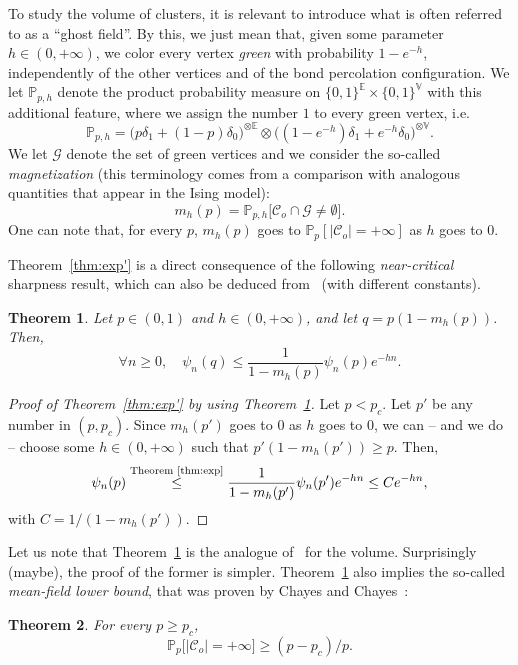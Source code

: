 \documentclass[10pt]{amsart}
\newtheorem{theo}{Theorem}[section]
\theoremstyle{definition}\newtheorem{defi}[theo]{Definition}\newtheorem{rema}[theo]{Remark}\newtheorem{exam}[theo]{Example}\newtheorem{exem}[theo]{Example}\newtheorem{nota}[theo]{Notation}
\newcommand{\E}{\mathbb{E}}
\newcommand{\V}{\mathbb{V}}
\newcommand{\Pro}{\mathbb{P}}
\newcommand{\calC}{\mathcal{C}}
\newcommand{\calG}{\mathcal{G}}
\let\oldforall\forall
\renewcommand*{\forall}{\mathrel{\oldforall}}
\begin{document}
To study the volume of clusters, it is relevant to introduce what is often referred to as a ``ghost field''. By this, we just mean that, given some parameter $h \in (0,+\infty)$, we color every vertex \emph{green} with probability $1-e^{-h}$, independently of the other vertices and of the bond percolation configuration. We let $\Pro_{p,h}$ denote the product probability measure on $\{0,1\}^{\E} \times \{0,1\}^{\V}$ with this additional feature, where we assign the number $1$ to every green vertex, i.e.
\[
\Pro_{p,h} = \big(p\delta_1+(1-p)\delta_0\big)^{\otimes \E} \otimes \big((1-e^{-h})\delta_1+e^{-h}\delta_0\big)^{\otimes \V}.
\]
We let $\calG$ denote the set of green vertices and we consider the so-called \emph{magnetization} (this terminology comes from a comparison with analogous quantities that appear in the Ising model):
\[
m_h(p)=\Pro_{p,h} \big[\calC_o \cap \calG \ne \emptyset \big].
\]
One can note that, for every $p$, $m_h(p)$ goes to $\Pro_p[|\calC_o|=+\infty]$ as $h$ goes to $0$.



Theorem~\ref{thm:exp'} is a direct consequence of the following \emph{near-critical} sharpness result, which can also be deduced from~\cite{Hut20} (with different constants).

\begin{theo}\label{thm:exp}
Let $p\in(0,1)$ and $h\in(0,+\infty)$, and let $q=p(1-m_h(p))$. Then,
\[
\forall n \ge 0, \quad \psi_n(q) \le \frac{1}{1-m_h(p)} \psi_n(p) e^{-hn}.
\]
\end{theo}

\begin{proof}[Proof of Theorem~\ref{thm:exp'} by using Theorem~\ref{thm:exp}]
Let $p<p_c$. Let $p'$ be any number in $(p,p_c)$. Since $m_h(p')$ goes to $0$ as $h$ goes to $0$, we can -- and we do -- choose some $h\in(0,+\infty)$ such that $p'(1-m_h(p'))\ge p$. Then,
\[
\psi_n(p) \overset{\text{Theorem~\ref{thm:exp}}}{\le} \frac{1}{1-m_h(p')}\psi_n(p')e^{-hn} \le Ce^{-hn},
\]
with $C=1/(1-m_h(p'))$.
\end{proof}

Let us note that Theorem~\ref{thm:exp} is the analogue of~\cite[Theorem~1.1]{Van22} for the volume. Surprisingly (maybe), the proof of the former is simpler. Theorem~\ref{thm:exp} also implies the so-called \emph{mean-field lower bound}, that was proven by Chayes and Chayes~\cite{CC87}:

\begin{theo}\label{thm:mf}
For every $p\ge p_c$,
\[
\Pro_p\big[|\calC_o|=+\infty\big]\ge (p-p_c)/p.
\]
\end{theo}
\end{document}

